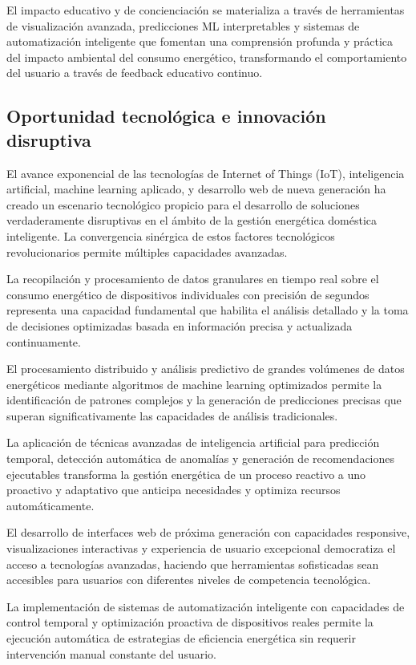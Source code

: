 El impacto educativo y de concienciación se materializa a través de herramientas de visualización avanzada, predicciones ML interpretables y sistemas de automatización inteligente que fomentan una comprensión profunda y práctica del impacto ambiental del consumo energético, transformando el comportamiento del usuario a través de feedback educativo continuo.

\subsection{Oportunidad tecnológica e innovación disruptiva}

El avance exponencial de las tecnologías de Internet of Things (IoT), inteligencia artificial, machine learning aplicado, y desarrollo web de nueva generación ha creado un escenario tecnológico propicio para el desarrollo de soluciones verdaderamente disruptivas en el ámbito de la gestión energética doméstica inteligente. La convergencia sinérgica de estos factores tecnológicos revolucionarios permite múltiples capacidades avanzadas.

La recopilación y procesamiento de datos granulares en tiempo real sobre el consumo energético de dispositivos individuales con precisión de segundos representa una capacidad fundamental que habilita el análisis detallado y la toma de decisiones optimizadas basada en información precisa y actualizada continuamente.

El procesamiento distribuido y análisis predictivo de grandes volúmenes de datos energéticos mediante algoritmos de machine learning optimizados permite la identificación de patrones complejos y la generación de predicciones precisas que superan significativamente las capacidades de análisis tradicionales.

La aplicación de técnicas avanzadas de inteligencia artificial para predicción temporal, detección automática de anomalías y generación de recomendaciones ejecutables transforma la gestión energética de un proceso reactivo a uno proactivo y adaptativo que anticipa necesidades y optimiza recursos automáticamente.

El desarrollo de interfaces web de próxima generación con capacidades responsive, visualizaciones interactivas y experiencia de usuario excepcional democratiza el acceso a tecnologías avanzadas, haciendo que herramientas sofisticadas sean accesibles para usuarios con diferentes niveles de competencia tecnológica.

La implementación de sistemas de automatización inteligente con capacidades de control temporal y optimización proactiva de dispositivos reales permite la ejecución automática de estrategias de eficiencia energética sin requerir intervención manual constante del usuario.

